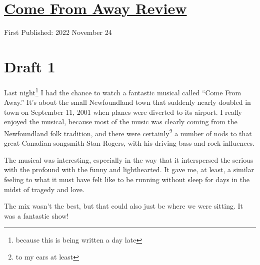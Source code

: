 \documentclass[12pt]{article}[titlepage]
\newcommand{\say}[1]{``#1''}
\newcommand{\1}{\={a}}
\newcommand{\2}{\={e}}
\newcommand{\3}{\={\i}}
\newcommand{\4}{\=o}
\newcommand{\5}{\=u}
\newcommand{\6}{\={A}}
\renewcommand{\,}{\textsuperscript{,}}
\begin{document}
\doublespacing
\section{\href{come-from-away.tex}{Come From Away Review}}
First Published: 2022 November 24

\section{Draft 1}
Last night\footnote{because this is being written a day late} I had the chance to watch a fantastic musical called \say{Come From Away.}
It's about the small Newfoundland town that suddenly nearly doubled in town on September 11, 2001 when planes were diverted to its airport.
I really enjoyed the musical, because most of the music was clearly coming from the Newfoundland folk tradition, and there were certainly\footnote{to my ears at least} a number of nods to that great Canadian songsmith Stan Rogers, with his driving bass and rock influences.

The musical was interesting, especially in the way that it interspersed the serious with the profound with the funny and lighthearted.
It gave me, at least, a similar feeling to what it must have felt like to be running without sleep for days in the midst of tragedy and love.

The mix wasn't the best, but that could also just be where we were sitting.
It was a fantastic show!
\end{document}
